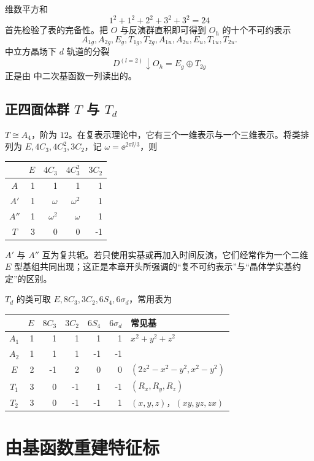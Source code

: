 维数平方和
\[
1^2+1^2+2^2+3^2+3^2=24
\]
首先检验了表的完备性。把 $O$ 与反演群直积即可得到 $O_h$ 的十个不可约表示
\[
A_{1g},A_{2g},E_g,T_{1g},T_{2g},
A_{1u},A_{2u},E_u,T_{1u},T_{2u}.
\]
中立方晶场下 $d$ 轨道的分裂
\[
D^{(l=2)}\downarrow O_h=E_g\oplus T_{2g}
\]
正是由  中二次基函数一列读出的。

\subsection{\texorpdfstring{正四面体群 $T$ 与 $T_d$}{正四面体群 T 与 Td}}

$T\cong A_4$，阶为 $12$。在复表示理论中，它有三个一维表示与一个三维表示。将类排列为 $E,4C_3,4C_3^2,3C_2$，记 $\omega=\ee^{2\pi\ii/3}$，则
\begin{center}
\begin{tabular}{c|rrrr}
\toprule
 & $E$ & $4C_3$ & $4C_3^2$ & $3C_2$\\
\midrule
$A$   &1&1&1&1\\
$A'$  &1&$\omega$&$\omega^2$&1\\
$A''$ &1&$\omega^2$&$\omega$&1\\
$T$   &3&0&0&-1\\
\bottomrule
\end{tabular}
\end{center}
$A'$ 与 $A''$ 互为复共轭。若只使用实基或再加入时间反演，它们经常作为一个二维 $E$ 型基组共同出现；这正是本章开头所强调的“复不可约表示”与“晶体学实基约定”的区别。

$T_d$ 的类可取 $E,8C_3,3C_2,6S_4,6\sigma_d$，常用表为
\begin{center}
\begin{tabular}{c|rrrrr|l}
\toprule
 & $E$&$8C_3$&$3C_2$&$6S_4$&$6\sigma_d$&常见基\\
\midrule
$A_1$&1&1&1&1&1&$x^2+y^2+z^2$\\
$A_2$&1&1&1&-1&-1&\\
$E$&2&-1&2&0&0&$(2z^2-x^2-y^2,x^2-y^2)$\\
$T_1$&3&0&-1&1&-1&$(R_x,R_y,R_z)$\\
$T_2$&3&0&-1&-1&1&$(x,y,z)$，$(xy,yz,zx)$\\
\bottomrule
\end{tabular}
\end{center}

\section{由基函数重建特征标}

